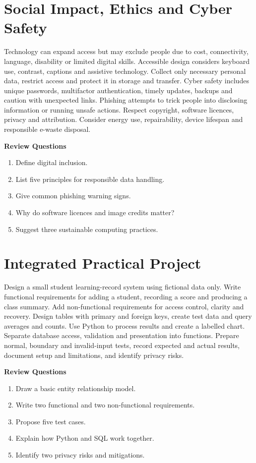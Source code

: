 \documentclass[11pt,openany,oneside]{book}
\newcommand{\reviewtitle}{\par\noindent\textbf{\color{Navy}Review Questions}\par}
\newcommand{\review}[1]{\par\smallskip\reviewtitle\begin{enumerate}[label=\arabic*.,leftmargin=1.8em,itemsep=1pt,topsep=2pt]\small #1\end{enumerate}\smallskip}
\begin{document}
\chapter{Social Impact, Ethics and Cyber Safety}
Technology can expand access but may exclude people due to cost, connectivity, language, disability or limited digital skills. Accessible design considers keyboard use, contrast, captions and assistive technology. Collect only necessary personal data, restrict access and protect it in storage and transfer.
Cyber safety includes unique passwords, multifactor authentication, timely updates, backups and caution with unexpected links. Phishing attempts to trick people into disclosing information or running unsafe actions. Respect copyright, software licences, privacy and attribution. Consider energy use, repairability, device lifespan and responsible e-waste disposal.
\review{\item Define digital inclusion.\item List five principles for responsible data handling.\item Give common phishing warning signs.\item Why do software licences and image credits matter?\item Suggest three sustainable computing practices.}
\chapter{Integrated Practical Project}
Design a small student learning-record system using fictional data only. Write functional requirements for adding a student, recording a score and producing a class summary. Add non-functional requirements for access control, clarity and recovery. Design tables with primary and foreign keys, create test data and query averages and counts.
Use Python to process results and create a labelled chart. Separate database access, validation and presentation into functions. Prepare normal, boundary and invalid-input tests, record expected and actual results, document setup and limitations, and identify privacy risks.
\review{\item Draw a basic entity relationship model.\item Write two functional and two non-functional requirements.\item Propose five test cases.\item Explain how Python and SQL work together.\item Identify two privacy risks and mitigations.}
\backmatter
\end{document}
